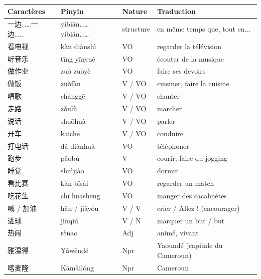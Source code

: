 \documentclass[11pt]{article}
\begin{document}
\begin{definition}
\begin{center}
\begin{tabularx}{\linewidth}{|X|X|X|X|}
\hline
\rowcolor{popblueL} Caractères & Pinyin & Nature & Traduction \\
\hline
一边……一边…… & yíbiān……yíbiān…… & structure & en même temps que, tout en... \\
\hline
看电视 & kàn diànshì & VO & regarder la télévision \\
\hline
听音乐 & tīng yīnyuè & VO & écouter de la musique \\
\hline
做作业 & zuò zuòyè & VO & faire ses devoirs \\
\hline
做饭 & zuòfàn & V / VO & cuisiner, faire la cuisine \\
\hline
唱歌 & chànggē & V / VO & chanter \\
\hline
走路 & zǒulù & V / VO & marcher \\
\hline
说话 & shuōhuà & V / VO & parler \\
\hline
开车 & kāichē & V / VO & conduire \\
\hline
打电话 & dǎ diànhuà & VO & téléphoner \\
\hline
跑步 & pǎobù & V & courir, faire du jogging \\
\hline
睡觉 & shuìjiào & VO & dormir \\
\hline
看比赛 & kàn bǐsài & VO & regarder un match \\
\hline
吃花生 & chī huāshēng & VO & manger des cacahuètes \\
\hline
喊 / 加油 & hǎn / jiāyóu & V / V & crier / Allez ! (encourager) \\
\hline
进球 & jìnqiú & V / N & marquer un but / but \\
\hline
热闹 & rènao & Adj & animé, vivant \\
\hline
雅温得 & Yǎwēndé & Npr & Yaoundé (capitale du Cameroun) \\
\hline
喀麦隆 & Kāmàilóng & Npr & Cameroun \\
\hline
\end{tabularx}
\end{center}
\end{definition}
\end{document}
